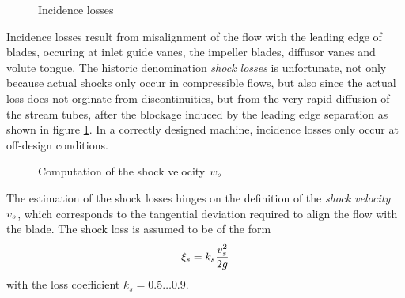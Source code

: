 \begin{figure}
  \caption{Incidence losses}
  \label{fig:shockIncidence}
\end{figure}
Incidence losses result from misalignment of the flow with the leading
edge of blades, occuring at inlet guide vanes, the impeller blades,
diffusor vanes and volute tongue. The historic denomination
\emph{shock losses} is unfortunate, not only because actual shocks
only occur in compressible flows, but also since the actual loss does
not orginate from discontinuities, but from the very rapid diffusion
of the stream tubes, after the blockage induced by the leading edge
separation as shown in figure \ref{fig:shockIncidence}. In a correctly
designed machine, incidence losses only occur at off-design
conditions.
\begin{figure}[!h]
  \centering{}
  \caption{Computation of the shock velocity $w_s$}
  \label{fig:shockLosses}
\end{figure}
The estimation of the shock losses hinges on the definition of the
\emph{shock velocity} $v_s$, which corresponds to the tangential
deviation required to align the flow with the blade. The shock loss is
assumed to be of the form
\begin{align*}
  \xi_{s} = k_s \frac{v_s^2}{2 g}
\end{align*}
with the loss coefficient $k_s = 0.5 \ldots 0.9$. 

